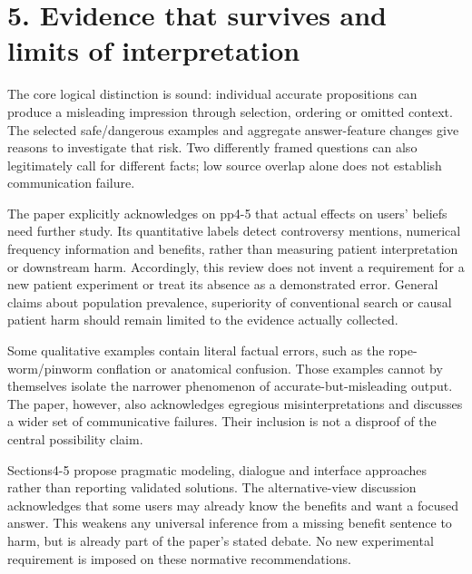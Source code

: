 \documentclass[10pt]{article}
\begin{document}
\section*{5. Evidence that survives and limits of interpretation}
The core logical distinction is sound: individual accurate propositions can produce a misleading impression through selection, ordering or omitted context. The selected safe/dangerous examples and aggregate answer-feature changes give reasons to investigate that risk. Two differently framed questions can also legitimately call for different facts; low source overlap alone does not establish communication failure.\par
The paper explicitly acknowledges on pp4-5 that actual effects on users’ beliefs need further study. Its quantitative labels detect controversy mentions, numerical frequency information and benefits, rather than measuring patient interpretation or downstream harm. Accordingly, this review does not invent a requirement for a new patient experiment or treat its absence as a demonstrated error. General claims about population prevalence, superiority of conventional search or causal patient harm should remain limited to the evidence actually collected.\par
Some qualitative examples contain literal factual errors, such as the rope-worm/pinworm conflation or anatomical confusion. Those examples cannot by themselves isolate the narrower phenomenon of accurate-but-misleading output. The paper, however, also acknowledges egregious misinterpretations and discusses a wider set of communicative failures. Their inclusion is not a disproof of the central possibility claim.\par
Sections4-5 propose pragmatic modeling, dialogue and interface approaches rather than reporting validated solutions. The alternative-view discussion acknowledges that some users may already know the benefits and want a focused answer. This weakens any universal inference from a missing benefit sentence to harm, but is already part of the paper’s stated debate. No new experimental requirement is imposed on these normative recommendations.\par
\end{document}
